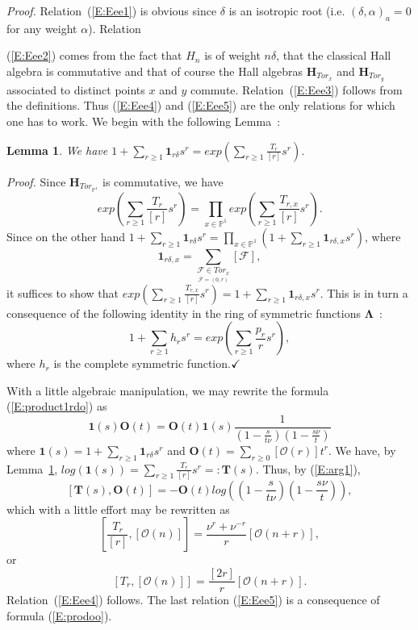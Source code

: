\documentclass[a4paper,10pt]{amsart}
\def\H{\mathbf{H}}
\def\qed{$\hfill \checkmark$}
\def\a{\alpha}
\def\O{\mathcal{O}}
\def\LLambda{\boldsymbol{\Lambda}}
\newtheorem{lem}[theo]{Lemma}
\numberwithin{equation}{section}
\begin{document}
\textit{Proof.} Relation~(\ref{E:Eee1}) is obvious since $\delta$ is an isotropic root (i.e. $(\delta,\a)_a=0$ for any weight $\a$). Relation~{(\ref{E:Eee2}) comes from the fact that $H_n$ is of weight $n\delta$, that the classical Hall algebra is commutative and that of course the Hall algebras $\H_{Tor_x}$ and $\H_{Tor_y}$ associated to distinct points $x$ and $y$ commute. Relation~(\ref{E:Eee3}) follows from the definitions. Thus (\ref{E:Eee4}) and (\ref{E:Eee5}) are the only relations for which one has to work. We begin with the following Lemma~:

\vspace{.1in}

\begin{lem}\label{L:relation4} We have $1+\sum_{r \geq 1} \mathbf{1}_{r\delta}s^r=exp(\sum_{r \geq 1} \frac{T_r}{[r]}s^r)$.
\end{lem}
\noindent
\textit{Proof.} Since $\H_{Tor_{\mathbb{P}^1}}$ is commutative, we have
$$exp(\sum_{r\geq 1}\frac{T_r}{[r]}s^r)=\prod_{x \in \mathbb{P}^1}exp(\sum_{r\geq 1}\frac{T_{r,x}}{[r]}s^r).$$
Since on the other hand $1 + \sum_{r\geq 1} \mathbf{1}_{r\delta}s^r=\prod_{x \in \mathbb{P}^1} (1 + \sum_{r\geq 1}\mathbf{1}_{r\delta,x}s^r)$, where
$$\mathbf{1}_{r\delta,x}=\sum_{\underset{\overline{\mathcal{F}}=(0,r)}{\mathcal{F}\in Tor_x}} [\mathcal{F}],$$
it suffices to show that $exp(\sum_{r\geq 1} \frac{T_{r,x}}{[r]}s^r)=1 + \sum_{r \geq 1} \mathbf{1}_{r\delta,x}s^r$. This is in turn a consequence of the following identity in the ring of symmetric functions $\LLambda$~:
$$1+\sum_{r \geq 1} h_r s^r=exp(\sum_{r \geq 1}\frac{p_r}{r}s^r),$$
where $h_r$ is the complete symmetric function.\qed

\vspace{.1in}

With a little algebraic manipulation, we may rewrite the formula (\ref{E:product1rdo}) as
\begin{equation}\label{E:arg1}
\mathbf{1}(s)\mathbf{O}(t)=\mathbf{O}(t)\mathbf{1}(s)\frac{1}{(1-\frac{s}{t\nu})(1-\frac{s\nu}{t})}
\end{equation}
where $\mathbf{1}(s)=1+\sum_{r \geq 1}\mathbf{1}_{r\delta}s^r$ and $\mathbf{O}(t)=\sum_{r \geq 0} [\O(r)]t^r$. We have, by Lemma~\ref{L:relation4}, $log(\mathbf{1}(s))=\sum_{r \geq 1} \frac{T_r}{[r]}s^r=: \mathbf{T}(s)$. Thus, by (\ref{E:arg1}),
\begin{equation}\label{E:arg2}
[\mathbf{T}(s),\mathbf{O}(t)]=-\mathbf{O}(t)log((1-\frac{s}{t\nu})(1-\frac{s\nu}{t})),
\end{equation}
which with a little effort may be rewritten as
$$[\frac{T_r}{[r]},[\O(n)]]=\frac{\nu^r+\nu^{-r}}{r}[\O(n+r)],$$
or
$$[T_r,[\O(n)]]=\frac{[2r]}{r}[\O(n+r)].$$
Relation~(\ref{E:Eee4}) follows. The last relation (\ref{E:Eee5}) is a consequence of formula (\ref{E:prodoo}).

}
\end{document}
